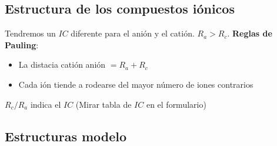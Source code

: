 \documentclass[12pt]{article}
\begin{document}
	\subsection{Estructura de los compuestos iónicos}
	Tendremos un $IC$ diferente para el anión y el catión. $R_a>R_c$.
	\textbf{Reglas de Pauling}:
	\begin{itemize}
		\item La distacia catión anión $= R_a+R_c$
		\item Cada ión tiende a rodearse del mayor número de iones contrarios
	\end{itemize}
	$R_c/R_a$ indica el $IC$ (Mirar tabla de $IC$ en el formulario)
	
	\subsection{Estructuras modelo}
\end{document}
